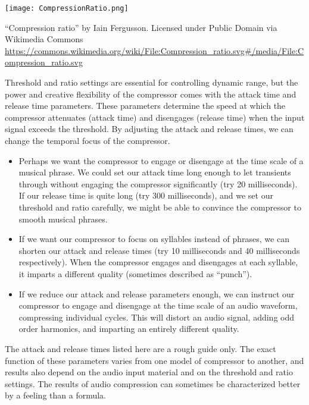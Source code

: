 \begin{marginfigure}
  \texttt{[image: CompressionRatio.png]}
  \caption{``Compression ratio'' by Iain Fergusson. Licensed under
     Public Domain via Wikimedia Commons 
     \url{https://commons.wikimedia.org/wiki/File:Compression_ratio.svg\#/media/File:Compression_ratio.svg}
   }
  \label{fig:comp-ratio}
\end{marginfigure}

Threshold and ratio settings are essential for controlling dynamic
range, but the power and creative flexibility of the compressor comes
with the attack time and release time parameters. These parameters
determine the speed at which the compressor attenuates (attack time)
and disengages (release time) when the input signal exceeds the
threshold. By adjusting the attack and release times, we can change
the temporal focus of the compressor.
\begin{itemize}
\item Perhaps we want the compressor to engage or disengage at the
  time scale of a musical phrase. We could set our attack time long
  enough to let transients through without engaging the compressor
  significantly (try 20 milliseconds). If our release time is quite
  long (try 300 milliseconds), and we set our threshold and ratio
  carefully, we might be able to convince the compressor to smooth
  musical phrases.
\item If we want our compressor to focus on syllables instead of
  phrases, we can shorten our attack and release times (try 10
  milliseconds and 40 milliseconds respectively). When the compressor
  engages and disengages at each syllable, it imparts a different
  quality (sometimes described as ``punch'').
\item If we reduce our attack and release parameters enough, we can
  instruct our compressor to engage and disengage at the time scale of
  an audio waveform, compressing individual cycles. This will distort
  an audio signal, adding odd order harmonics, and imparting an entirely different quality.
\end{itemize}
The attack and release times listed here are a rough guide only.  The
exact function of these parameters varies from one model of compressor
to another, and results also depend on the audio input material and
on the threshold and ratio settings. The results of audio
compression can sometimes be characterized better by a feeling than a
formula.

